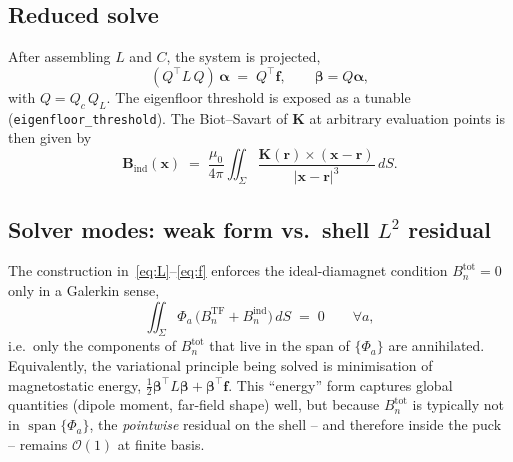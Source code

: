 \documentclass[11pt]{article}
\newcommand{\bK}{\mathbf{K}}
\newcommand{\bB}{\mathbf{B}}
\newcommand{\br}{\mathbf{r}}
\newcommand{\mubeta}{\boldsymbol{\beta}}
\newcommand{\muf}{\mathbf{f}}
\begin{document}
\subsection{Reduced solve}
After assembling $L$ and $C$, the system is projected,
\begin{equation}
  (Q^\top L\,Q)\,\boldsymbol\alpha \;=\; Q^\top\muf, \qquad
  \mubeta = Q\boldsymbol\alpha ,
\end{equation}
with $Q = Q_c\,Q_L$.  The eigenfloor threshold is exposed as a
tunable (\texttt{eigenfloor\_threshold}).  The Biot--Savart of $\bK$
at arbitrary evaluation points is then given by
\begin{equation}
  \bB_{\text{ind}}(\mathbf x) \;=\;
  \frac{\mu_0}{4\pi}\!\iint_{\Sigma}
  \frac{\bK(\br)\times(\mathbf x-\br)}{|\mathbf x-\br|^3}\,dS .
  \label{eq:bs}
\end{equation}

\subsection{Solver modes: weak form vs.\ shell \texorpdfstring{$L^2$}{L2}
residual}
\label{sec:solver-modes}

The construction in~\eqref{eq:L}--\eqref{eq:f} enforces the
ideal-diamagnet condition $B_n^{\text{tot}}=0$ only in a Galerkin
sense,
\begin{equation}
  \iint_\Sigma \Phi_a\,\bigl(B_n^{\text{TF}} + B_n^{\text{ind}}\bigr)\,
  dS \;=\; 0 \qquad \forall a ,
  \label{eq:galerkin}
\end{equation}
i.e.\ only the components of $B_n^{\text{tot}}$ that live in the span
of $\{\Phi_a\}$ are annihilated.  Equivalently, the variational
principle being solved is minimisation of magnetostatic energy,
$\tfrac12\mubeta^\top L\mubeta + \mubeta^\top\muf$.  This ``energy''
form captures global quantities (dipole moment, far-field shape)
well, but because $B_n^{\text{tot}}$ is typically not in
$\operatorname{span}\{\Phi_a\}$, the \emph{pointwise} residual on the
shell -- and therefore inside the puck -- remains $\mathcal O(1)$ at
finite basis.
\end{document}
